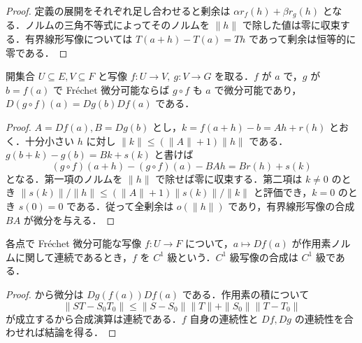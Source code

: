\begin{proof}
定義の展開をそれぞれ足し合わせると剰余は $\alpha r_f(h)+\beta r_g(h)$ となる．ノルムの三角不等式によってそのノルムを $\|h\|$ で除した値は零に収束する．有界線形写像については $T(a+h)-T(a)=Th$ であって剰余は恒等的に零である．
\end{proof}
\begin{prop}[連鎖律]
開集合 $U\subseteq E,V\subseteq F$ と写像 $f:U\to V,\ g:V\to G$ を取る．$f$ が $a$ で，$g$ が $b=f(a)$ で Fréchet 微分可能ならば $g\circ f$ も $a$ で微分可能であり，$D(g\circ f)(a)=Dg(b)Df(a)$ である．
\end{prop}
\begin{proof}
$A=Df(a), B=Dg(b)$ とし，$k=f(a+h)-b=Ah+r(h)$ とおく．十分小さい $h$ に対し $\|k\|\leq(\|A\|+1)\|h\|$ である．$g(b+k)-g(b)=Bk+s(k)$ と書けば
\[
(g\circ f)(a+h)-(g\circ f)(a)-BAh=Br(h)+s(k)
\]
となる．第一項のノルムを $\|h\|$ で除せば零に収束する．第二項は $k\ne0$ のとき $\|s(k)\|/\|h\|\leq(\|A\|+1)\|s(k)\|/\|k\|$ と評価でき，$k=0$ のとき $s(0)=0$ である．従って全剰余は $o(\|h\|)$ であり，有界線形写像の合成 $BA$ が微分を与える．
\end{proof}
\begin{prop}[微分と連続微分可能性]
各点で Fréchet 微分可能な写像 $f:U\to F$ について，$a\mapsto Df(a)$ が作用素ノルムに関して連続であるとき，$f$ を $C^1$ 級という．$C^1$ 級写像の合成は $C^1$ 級である．
\end{prop}
\begin{proof}
 から微分は $Dg(f(a))Df(a)$ である．作用素の積について
\[
\|ST-S_0T_0\|\leq\|S-S_0\|\|T\|+\|S_0\|\|T-T_0\|
\]
が成立するから合成演算は連続である．$f$ 自身の連続性と $Df,Dg$ の連続性を合わせれば結論を得る．
\end{proof}
